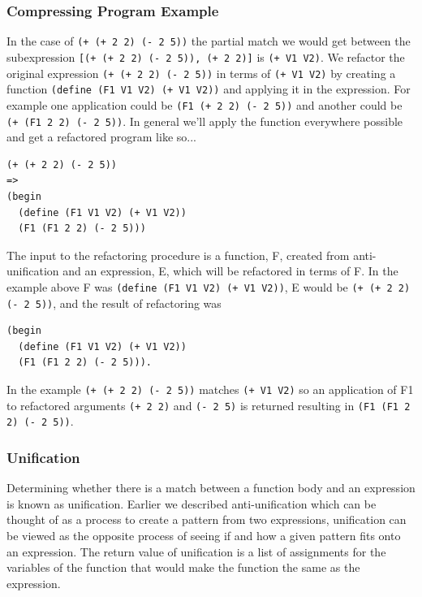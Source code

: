 \documentclass[a4paper,10pt]{article}
\begin{document}
\subsubsection{Compressing Program Example}
In the case of \texttt{(+ (+ 2 2) (- 2 5))} the partial match we would get between the subexpression \texttt{[(+ (+ 2 2) (- 2 5)), (+ 2 2)]} is \texttt{(+ V1 V2)}.  We refactor the original expression \texttt{(+ (+ 2 2) (- 2 5))} in terms of \texttt{(+ V1 V2)} by creating a function \texttt{(define (F1 V1 V2) (+ V1 V2))} and applying it in the expression.  For example one application could be \texttt{(F1 (+ 2 2) (- 2 5))} and another could be \texttt{(+ (F1 2 2) (- 2 5))}.  In general we'll apply the function everywhere possible and get a refactored program like so...
\begin{lstlisting}
(+ (+ 2 2) (- 2 5))
=>
(begin
  (define (F1 V1 V2) (+ V1 V2))
  (F1 (F1 2 2) (- 2 5)))
\end{lstlisting}
The input to the refactoring procedure is a function, F, created from anti-unification and an expression, E, which will be refactored in terms of F.  In the example above F was \texttt{(define (F1 V1 V2) (+ V1 V2))}, E would be \texttt{(+ (+ 2 2) (- 2 5))}, and the result of refactoring was 
\begin{lstlisting}
(begin
  (define (F1 V1 V2) (+ V1 V2))
  (F1 (F1 2 2) (- 2 5))).
\end{lstlisting}

In the example \texttt{(+ (+ 2 2) (- 2 5))} matches \texttt{(+ V1 V2)} so an application of F1 to refactored arguments \texttt{(+ 2 2)} and \texttt{(- 2 5)} is returned resulting in \texttt{(F1 (F1 2 2) (- 2 5))}.  


\subsubsection{Unification}
Determining whether there is a match between a function body and an expression is known as unification.  Earlier we described anti-unification which can be thought of as a process to create a pattern from two expressions, unification can be viewed as the opposite process of seeing if and how a given pattern fits onto an expression.  The return value of unification is a list of assignments for the variables of the function that would make the function the same as the expression.
\end{document}
